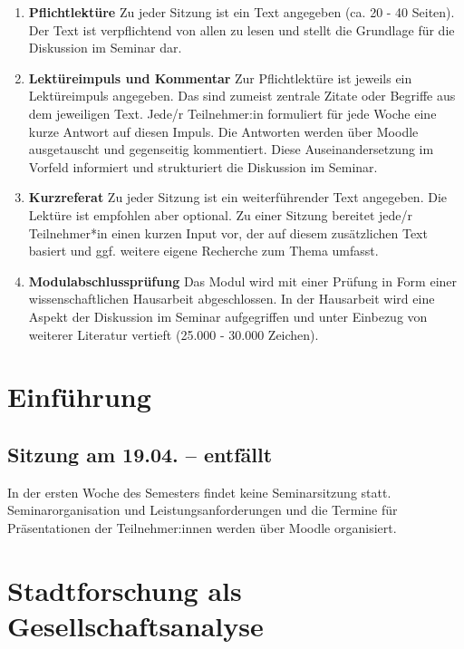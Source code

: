 \documentclass[
]{article}
\begin{document}
\begin{enumerate}
\def\labelenumi{\arabic{enumi}.}
\item
  \textbf{Pflichtlektüre} Zu jeder Sitzung ist ein Text angegeben (ca. 20 - 40 Seiten). Der Text ist verpflichtend von allen zu lesen und stellt die Grundlage für die Diskussion im Seminar dar.
\item
  \textbf{Lektüreimpuls und Kommentar} Zur Pflichtlektüre ist jeweils ein Lektüreimpuls angegeben. Das sind zumeist zentrale Zitate oder Begriffe aus dem jeweiligen Text. Jede/r Teilnehmer:in formuliert für jede Woche eine kurze Antwort auf diesen Impuls. Die Antworten werden über Moodle ausgetauscht und gegenseitig kommentiert. Diese Auseinandersetzung im Vorfeld informiert und strukturiert die Diskussion im Seminar.
\item
  \textbf{Kurzreferat} Zu jeder Sitzung ist ein weiterführender Text angegeben. Die Lektüre ist empfohlen aber optional. Zu einer Sitzung bereitet jede/r Teilnehmer*in einen kurzen Input vor, der auf diesem zusätzlichen Text basiert und ggf. weitere eigene Recherche zum Thema umfasst.
\item
  \textbf{Modulabschlussprüfung} Das Modul wird mit einer Prüfung in Form einer wissenschaftlichen Hausarbeit abgeschlossen. In der Hausarbeit wird eine Aspekt der Diskussion im Seminar aufgegriffen und unter Einbezug von weiterer Literatur vertieft (25.000 - 30.000 Zeichen).
\end{enumerate}

\pagebreak

\hypertarget{einfuxfchrung}{%
\section{Einführung}\label{einfuxfchrung}}

\hypertarget{sitzung-am-19.04.-entfuxe4llt}{%
\subsection{Sitzung am 19.04. -- entfällt}\label{sitzung-am-19.04.-entfuxe4llt}}

In der ersten Woche des Semesters findet keine Seminarsitzung statt. Seminarorganisation und Leistungsanforderungen und die Termine für Präsentationen der Teilnehmer:innen werden über Moodle organisiert.

\hypertarget{stadtforschung-als-gesellschaftsanalyse}{%
\section{Stadtforschung als Gesellschaftsanalyse}\label{stadtforschung-als-gesellschaftsanalyse}}
\end{document}
